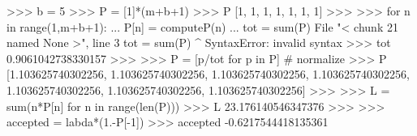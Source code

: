 
>>> b = 5
>>> P = [1]*(m+b+1)
>>> P
[1, 1, 1, 1, 1, 1, 1]
>>>
>>> for n in range(1,m+b+1):
...     P[n] = computeP(n)
... tot = sum(P)
  File "< chunk 21 named None >", line 3
    tot = sum(P)
      ^
SyntaxError: invalid syntax
>>> tot
0.9061042738330157
>>>
>>> P = [p/tot for p in P] # normalize
>>> P
[1.103625740302256, 1.103625740302256, 1.103625740302256,
1.103625740302256, 1.103625740302256, 1.103625740302256,
1.103625740302256]
>>>
>>> L = sum(n*P[n] for n in range(len(P)))
>>> L
23.176140546347376
>>>
>>> accepted = labda*(1.-P[-1])
>>> accepted
-0.6217544418135361

